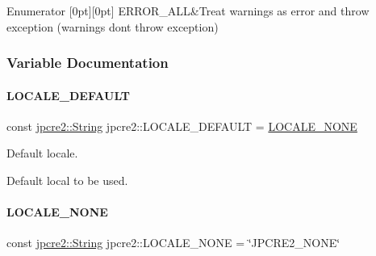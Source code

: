 \begin{DoxyEnumFields}{Enumerator}
[0pt][0pt]{}\hypertarget{namespacejpcre2_a85c143271501e383843f45b9999c2f00_a85c143271501e383843f45b9999c2f00a6fec35fc9fdd8a606bed430c1816c552}{}\label{namespacejpcre2_a85c143271501e383843f45b9999c2f00_a85c143271501e383843f45b9999c2f00a6fec35fc9fdd8a606bed430c1816c552} 
E\+R\+R\+O\+R\+\_\+\+A\+LL&Treat warnings as error and throw exception (warnings don\textquotesingle{}t throw exception) \\
\hline

\end{DoxyEnumFields}


\subsubsection{Variable Documentation}
\hypertarget{namespacejpcre2_adfdd3d1fff99e685734ae4e59771e84d_adfdd3d1fff99e685734ae4e59771e84d}{}\label{namespacejpcre2_adfdd3d1fff99e685734ae4e59771e84d_adfdd3d1fff99e685734ae4e59771e84d} 
\paragraph{\texorpdfstring{L\+O\+C\+A\+L\+E\+\_\+\+D\+E\+F\+A\+U\+LT}{LOCALE\_DEFAULT}}
{\footnotesize\ttfamily const \hyperlink{namespacejpcre2_a91f03070152fb228bc116c5a737f1d16}{jpcre2\+::\+String} jpcre2\+::\+L\+O\+C\+A\+L\+E\+\_\+\+D\+E\+F\+A\+U\+LT = \hyperlink{namespacejpcre2_ad2236dcdcc14d580724b256ce7f168e5_ad2236dcdcc14d580724b256ce7f168e5}{L\+O\+C\+A\+L\+E\+\_\+\+N\+O\+NE}}



Default locale. 

Default local to be used. \hypertarget{namespacejpcre2_ad2236dcdcc14d580724b256ce7f168e5_ad2236dcdcc14d580724b256ce7f168e5}{}\label{namespacejpcre2_ad2236dcdcc14d580724b256ce7f168e5_ad2236dcdcc14d580724b256ce7f168e5} 
\paragraph{\texorpdfstring{L\+O\+C\+A\+L\+E\+\_\+\+N\+O\+NE}{LOCALE\_NONE}}
{\footnotesize\ttfamily const \hyperlink{namespacejpcre2_a91f03070152fb228bc116c5a737f1d16}{jpcre2\+::\+String} jpcre2\+::\+L\+O\+C\+A\+L\+E\+\_\+\+N\+O\+NE = \char`\"{}J\+P\+C\+R\+E2\+\_\+\+N\+O\+NE\char`\"{}}



